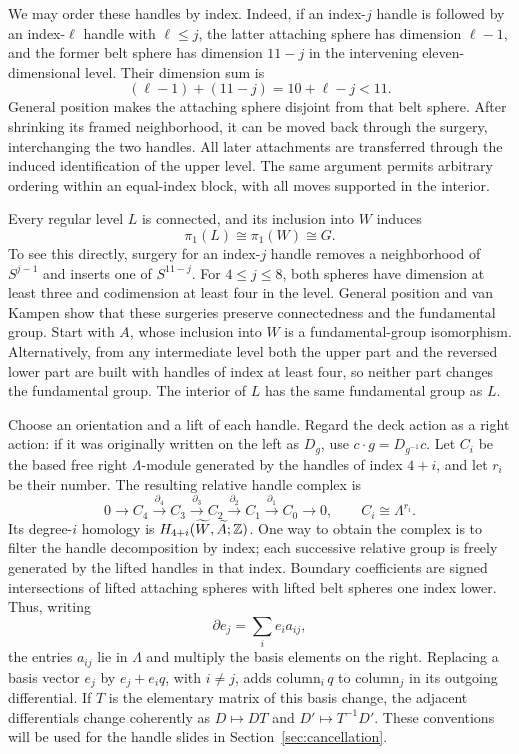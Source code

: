 We may order these handles by index.  Indeed, if an index-$j$ handle
is followed by an index-$\ell$ handle with $\ell\leq j$, the latter
attaching sphere has dimension $\ell-1$, and the former belt sphere
has dimension $11-j$ in the intervening eleven-dimensional level.
Their dimension sum is
\[
 (\ell-1)+(11-j)=10+\ell-j<11.
\]
General position makes the attaching sphere disjoint from that belt
sphere.  After shrinking its framed neighborhood, it can be moved
back through the surgery, interchanging the two handles.  All later
attachments are transferred through the induced identification of
the upper level.  The same argument permits arbitrary ordering
within an equal-index block, with all moves supported in the interior.

Every regular level $L$ is connected, and its inclusion into $W$
induces
\begin{equation}
 \pi_1(L)\cong\pi_1(W)\cong G.
 \label{eq:level-fundamental-group}
\end{equation}
To see this directly, surgery for an index-$j$ handle removes a
neighborhood of $S^{j-1}$ and inserts one of $S^{11-j}$.  For
$4\leq j\leq8$, both spheres have dimension at least three and
codimension at least four in the level.  General position and van
Kampen show that these surgeries preserve connectedness and the
fundamental group.  Start with $A$, whose inclusion into $W$ is a
fundamental-group isomorphism.  Alternatively, from any intermediate
level both the upper part and the reversed lower part are built with
handles of index at least four, so neither part changes the
fundamental group.  The interior of $L$ has the same fundamental
group as $L$.

Choose an orientation and a lift of each handle.  Regard the deck
action as a right action: if it was originally written on the left
as $D_g$, use $c\cdot g=D_{g^{-1}}c$.  Let $C_i$ be the based free
right $\Lambda$-module generated by the handles of index $4+i$, and
let $r_i$ be their number.  The resulting relative handle complex is
\begin{equation}
 0\longrightarrow C_4\xrightarrow{\partial_4}C_3
 \xrightarrow{\partial_3}C_2\xrightarrow{\partial_2}C_1
 \xrightarrow{\partial_1}C_0\longrightarrow0,
 \qquad C_i\cong\Lambda^{r_i}.
 \label{eq:handle-complex}
\end{equation}
Its degree-$i$ homology is
$H_{4+i}(\widetilde W,\widetilde A;\mathbb Z)$.  One way to obtain the
complex is to filter the handle decomposition by index; each
successive relative group is freely generated by the lifted handles
in that index.  Boundary coefficients are signed intersections of
lifted attaching spheres with lifted belt spheres one index lower.
Thus, writing
\[
 \partial e_j=\sum_i e_i a_{ij},
\]
the entries $a_{ij}$ lie in $\Lambda$ and multiply the basis elements
on the right.  Replacing a basis vector $e_j$ by $e_j+e_i q$, with $i\neq j$, adds
column$_i\,q$ to column$_j$ in its outgoing differential.  If $T$
is the elementary matrix of this basis change, the adjacent
differentials change coherently as $D\mapsto DT$ and
$D'\mapsto T^{-1}D'$.  These conventions will be used for the handle
slides in Section~\ref{sec:cancellation}.

